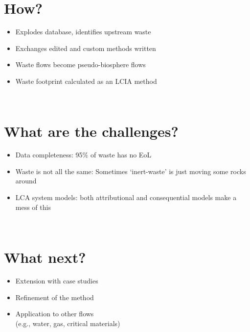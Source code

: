 \documentclass[a0paper,fleqn]{betterposter}
\begin{document}
{    \section{How?}
    \begin{itemize}
        \item Explodes database, identifies upstream waste
        \item Exchanges edited and custom methods written
        \item Waste flows become pseudo-biosphere flows
        \item Waste footprint calculated as an LCIA method
    \end{itemize}\\

    \section{What are the challenges?}
    \begin{itemize}
        \item Data completeness: 95\% of waste has no EoL
        \item Waste is not all the same: Sometimes `inert-waste' is just moving some rocks around
        \item LCA system models: both attributional and consequential models make a mess of this
    \end{itemize}\\

    \section{What next?}
    \begin{itemize}
        \item Extension with case studies
        \item Refinement of the method
        \item Application to other flows \\
        (e.g., water, gas, critical materials)
    \end{itemize}

    }{

}
\end{document}
